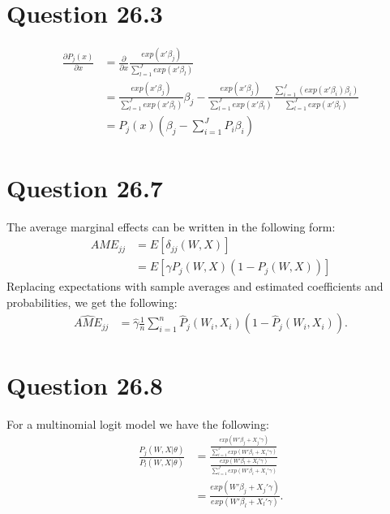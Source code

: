 \documentclass[11pt]{article} %
\begin{document}
\section{Question 26.3}
\begin{align*}
\frac{\partial P_j(x)}{\partial x} &= \frac{\partial }{\partial x} \frac{exp(x'\beta_j)}{\sum_{l=1}^{J}exp(x'\beta_l)}\\
&=  \frac{exp(x'\beta_j)}{\sum_{l=1}^{J}exp(x'\beta_l)} \beta_j -  \frac{exp(x'\beta_j)}{\sum_{l=1}^{J}exp(x'\beta_l)} \frac{\sum_{i=1}^J(exp(x'\beta_i)\beta_i)}{\sum_{l=1}^{J}exp(x'\beta_l)}\\
&= P_j(x)\left(\beta_j - \sum_{i=1}^J P_{i}\beta_i \right)
\end{align*}
\section{Question 26.7}
The average marginal effects can be written in the following form:
\begin{align*}
AME_{jj} &= E[\delta_{jj}(W,X)]\\
&= E[\gamma P_{j}(W,X)(1-P_j(W,X))]
\end{align*}
Replacing expectations with sample averages and estimated coefficients and probabilities, we get the following:
\begin{align*}
\hat{AME}_{jj} &= \hat{\gamma}\frac{1}{n}\sum_{i=1}^n\hat{P}_j(W_i,X_i)(1-\hat{P}_j(W_i,X_i)).
\end{align*}
\section{Question 26.8}
For a multinomial logit model we have the following:
\begin{align*}
\frac{P_j(W,X|\theta)}{P_l(W,X|\theta)} &= \frac{\frac{exp(W'\beta_j + X_j'\gamma)}{\sum_{i=1}^{J}exp(W'\beta_i + X_i'\gamma)}}{\frac{exp(W'\beta_l + X_l'\gamma)}{\sum_{i=1}^{J}exp(W'\beta_i + X_i'\gamma)}} \\
&= \frac{exp(W'\beta_j + X_j'\gamma)}{exp(W'\beta_l + X_l'\gamma)}.
\end{align*}
\end{document}
